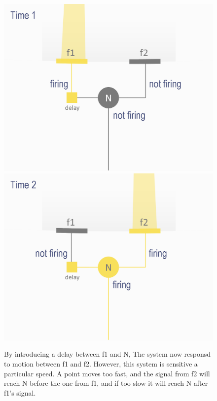 \documentclass[11pt,a4paper,oneside,table,xcdraw]{article}
\begin{document}
\begin{figure}[H]
\begin{multicols}{2}
\includegraphics[width=1\linewidth]{figure/model3.png}
\columnbreak
\includegraphics[width=1\linewidth]{figure/model4.png}
\end{multicols}
\caption{By introducing a delay between f1 and N, The system now responsd to motion between f1 and f2. However, this system is sensitive a particular speed. A point moves too fast, and the signal from f2 will reach N before the one from f1, and if too slow it will reach N after f1's signal.}
\label{fig:delay}
\end{figure}
\end{document}

